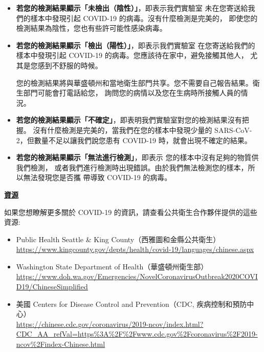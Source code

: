 \documentclass[10pt]{article}
\begin{document}
\begin{itemize}


\item

  \textbf{若您的檢測結果顯示「未檢出（陰性）」}，即表示我們實驗室
  未在您寄送給我們的樣本中發現引起 COVID-19 的病毒。沒有什麼檢測是完美的，
  即使您的檢測結果為陰性，您也有些許可能性感染病毒。

\item

  \textbf{若您的檢測結果顯示「檢出（陽性）」}，即表示我們實驗室
  在您寄送給我們的樣本中發現引起 COVID-19 的病毒。您應該待在家中，避免接觸其他人，
  尤其是您感到不舒服的時候。

  您的檢測結果將與華盛頓州和當地衛生部門共享。您不需要自己報告結果。衛生部門可能會打電話給您，
  詢問您的病情以及您在生病時所接觸人員的情況。

\item

  \textbf{若您的檢測結果顯示「不確定」}，即表明我們實驗室對您的檢測結果沒有把握。
  沒有什麼檢測是完美的，當我們在您的樣本中發現少量的 SARS-CoV-2，但數量不足以讓我們說您患有
  COVID-19 時，就會出現不確定的結果。

\item

  \textbf{若您的檢測結果顯示「無法進行檢測」}，即表示 您的樣本中沒有足夠的物質供我們檢測，
  或者我們進行檢測時出現錯誤。由於我們無法檢測您的樣本，所以無法發現您是否攜 帶導致 COVID-19
  的病毒。

\end{itemize}

\bigskip

\large \underline{\textbf{資源}}

如果您想瞭解更多關於 COVID-19 的資訊，請查看公共衛生合作夥伴提供的這些資源:

\begin{itemize}
\item
  Public Health \textemdash Seattle \& King County（西雅圖和金縣公共衛生）\\
  \url{https://www.kingcounty.gov/depts/health/covid-19/languages/chinese.aspx}

\item

  Washington State Department of Health（華盛頓州衛生部）\\
  \url{https://www.doh.wa.gov/Emergencies/NovelCoronavirusOutbreak2020COVID19/ChineseSimplified}

\item
  美國 Centers for Disease Control and Prevention（CDC, 疾病控制和預防中心）\\
  \url{https://chinese.cdc.gov/coronavirus/2019-ncov/index.html?CDC\_AA\_refVal=https%3A%2F%2Fwww.cdc.gov%2Fcoronavirus%2F2019-ncov%2Findex-Chinese.html}

\end{itemize}
\end{document}
